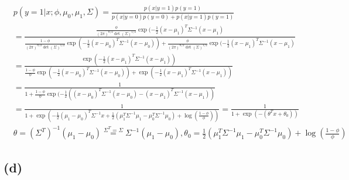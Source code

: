 \documentclass{article}
\begin{document}
\begin{align*}
    & p(y=1|x;\phi,\mu_{0},\mu_{1},\Sigma) = \frac{p(x|y=1)p(y=1)}{p(x|y=0)p(y=0)+p(x|y=1)p(y=1)}                                                                                                                                                                                                                        \\
    & =\frac{\frac{\phi}{(2\pi)^{n/2}\det(\Sigma)^{1/2}}\exp(-\frac{1}{2}(x-\mu_{1})^{T}\Sigma^{-1}(x-\mu_{1})}{\frac{1-\phi}{(2\pi)^{n/2}\det(\Sigma)^{1/2}}\exp(-\frac{1}{2}(x-\mu_{0})^{T}\Sigma^{-1}(x-\mu_{0})) +\frac{\phi}{(2\pi)^{n/2}\det(\Sigma)^{1/2}}\exp(-\frac{1}{2}(x-\mu_{1})^{T}\Sigma^{-1}(x-\mu_{1})} \\
    & = \frac{\exp(-\frac{1}{2}(x-\mu_{1})^{T}\Sigma^{-1}(x-\mu_{1}))}{\frac{1-\phi}{\phi}\exp(-\frac{1}{2}(x-\mu_{0})^{T}\Sigma^{-1}(x-\mu_{0}))+\exp(-\frac{1}{2}(x-\mu_{1})^{T}\Sigma^{-1}(x-\mu_{1}))}                                                                                                               \\
    & = \frac{1}{1 + \frac{1-\phi}{\phi}\exp(-\frac{1}{2}((x-\mu_{0})^{T}\Sigma^{-1}(x-\mu_{0})-(x-\mu_{1})^{T}\Sigma^{-1}(x-\mu_{1}))}                                                                                                                                                                                  \\
    & = \frac{1}{1+\exp(-\frac{1}{2}(\mu_{1}-\mu_{0})^T\Sigma^{-1}x+\frac{1}{2}(\mu_{1}^{T}\Sigma^{-1}\mu_{1}-\mu_{0}^{T}\Sigma^{-1}\mu_{0})+\log(\frac{1-\phi}{\phi}))}=\frac{1}{1+\exp(-(\theta^{T}x+\theta_{0}))}                                                                                                     \\
    & \theta=(\Sigma^T)^{-1}(\mu_{1}-\mu_{0})\overset{\Sigma^{T}=\Sigma}{=}\Sigma^{-1}(\mu_{1}-\mu_{0}),\theta_{0}=\frac{1}{2}(\mu_{1}^{T}\Sigma^{-1}\mu_{1}-\mu_{0}^{T}\Sigma^{-1}\mu_{0})+\log(\frac{1-\phi}{\phi})
\end{align*}

\subsection*{(d)}
\end{document}

